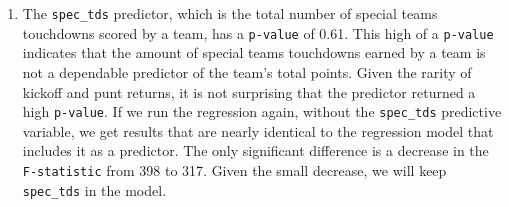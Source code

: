 \documentclass[
  letterpaper,
]{krantz}
\newenvironment{Shaded}{\begin{snugshade}}{\end{snugshade}}
\newcommand{\DecValTok}[1]{\textcolor[rgb]{0.68,0.00,0.00}{#1}}
\newcommand{\FunctionTok}[1]{\textcolor[rgb]{0.28,0.35,0.67}{#1}}
\newcommand{\NormalTok}[1]{\textcolor[rgb]{0.00,0.23,0.31}{#1}}
\newcommand{\OtherTok}[1]{\textcolor[rgb]{0.00,0.23,0.31}{#1}}
\newcommand{\SpecialCharTok}[1]{\textcolor[rgb]{0.37,0.37,0.37}{#1}}
\providecommand{\tightlist}{%
  \setlength{\itemsep}{0pt}\setlength{\parskip}{0pt}}\usepackage{longtable,booktabs,array}
\begin{document}
\begin{tcolorbox}[enhanced jigsaw, left=2mm, toprule=.15mm, opacitybacktitle=0.6, leftrule=.75mm, bottomrule=.15mm, colbacktitle=quarto-callout-tip-color!10!white, breakable, colback=white, bottomtitle=1mm, toptitle=1mm, title=\textcolor{quarto-callout-tip-color}{\faLightbulb}\hspace{0.5em}{Tip}, coltitle=black, titlerule=0mm, arc=.35mm, opacityback=0, colframe=quarto-callout-tip-color-frame, rightrule=.15mm]

\begin{Shaded}
\end{Shaded}

\end{tcolorbox}

\begin{enumerate}
\def\labelenumi{\arabic{enumi}.}
\setcounter{enumi}{1}
\tightlist
\item
  The \texttt{spec\_tds} predictor, which is the total number of special
  teams touchdowns scored by a team, has a \texttt{p-value} of 0.61.
  This high of a \texttt{p-value} indicates that the amount of special
  teams touchdowns earned by a team is not a dependable predictor of the
  team's total points. Given the rarity of kickoff and punt returns, it
  is not surprising that the predictor returned a high \texttt{p-value}.
  If we run the regression again, without the \texttt{spec\_tds}
  predictive variable, we get results that are nearly identical to the
  regression model that includes it as a predictor. The only significant
  difference is a decrease in the \texttt{F-statistic} from 398 to 317.
  Given the small decrease, we will keep \texttt{spec\_tds} in the
  model.
\end{enumerate}
\end{document}
